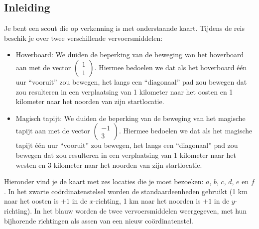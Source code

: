 \documentclass{ximera}
\begin{document}
\author{Alexander Holvoet}


\subsection*{Inleiding}
Je bent een scout die op verkenning is met onderstaande kaart.
Tijdens de reis beschik je over twee verschillende vervoersmiddelen:
\begin{itemize}
    \item Hoverboard: We duiden de beperking van de beweging van het hoverboard aan met de vector $\begin{pmatrix} 1\\ 1\end{pmatrix}$.
    Hiermee bedoelen we dat als het hoverboard één uur ``vooruit'' zou bewegen, het langs een ``diagonaal'' pad zou bewegen dat zou resulteren in een verplaatsing van 1 kilometer naar het oosten en 1 kilometer naar het noorden van zijn startlocatie.
    \item Magisch tapijt: We duiden de beperking van de beweging van het magische tapijt aan met de vector $\begin{pmatrix} -1 \\ 3 \end{pmatrix}$.
    Hiermee bedoelen we dat als het magische tapijt één uur ``vooruit'' zou bewegen, het langs een ``diagonaal'' pad zou bewegen dat zou resulteren in een verplaatsing van 1 kilometer naar het westen en 3 kilometer naar het noorden van zijn startlocatie.
\end{itemize}

Hieronder vind je de kaart met zes locaties die je moet bezoeken: $a$, $b$, $c$, $d$, $e$ en $f$.
In het zwarte coördinatenstelsel worden de standaardeenheden gebruikt (1 km naar het oosten is \(+1\) in de \(x\)-richting, 1 km naar het noorden is \(+1\) in de \(y\)-richting).
In het blauw worden de twee vervoersmiddelen weergegeven, met hun bijhorende richtingen als assen van een nieuw coördinatenstel.
\end{document}
